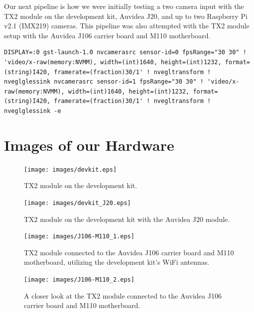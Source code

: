 \documentclass[letterpaper,10pt,serif,draftclsnofoot,onecolumn,compsoc,titlepage]{IEEEtran}
\begin{document}
Our next pipeline is how we were initially testing a two camera input with the TX2 module 
on the development kit, Auvidea J20, and up to two Raspberry Pi v2.1 (IMX219) cameras. 
This pipeline was also attempted with the TX2 module setup with the Auvidea J106 carrier
board and M110 motherboard. \\

\begin{lstlisting}
DISPLAY=:0 gst-launch-1.0 nvcamerasrc sensor-id=0 fpsRange="30 30" ! 'video/x-raw(memory:NVMM), width=(int)1640, height=(int)1232, format=(string)I420, framerate=(fraction)30/1' ! nvegltransform ! nveglglessink nvcamerasrc sensor-id=1 fpsRange="30 30" ! 'video/x-raw(memory:NVMM), width=(int)1640, height=(int)1232, format=(string)I420, framerate=(fraction)30/1' ! nvegltransform ! nveglglessink -e
\end{lstlisting}
\cite{TwoCamPipe}


\section{Images of our Hardware}


\begin{figure}[H]
	\centering
	\label{fig:TX2 module on the development kit.}
	\texttt{[image: images/devkit.eps]}
	\caption{TX2 module on the development kit. \label{overflow}}
\end{figure}


\begin{figure}[H]
	\centering
	\label{fig:TX2 module on the development kit with the Auvidea J20 module.}
	\texttt{[image: images/devkit\_J20.eps]}
	\caption{TX2 module on the development kit with the Auvidea J20 module. \label{overflow}}
\end{figure}


\begin{figure}[H]
	\centering
	\label{fig:TX2 module connected to the Auvidea J106 carrier board and M110 motherboard, utilizing the development kit's WiFi antennas.}
	\texttt{[image: images/J106-M110\_1.eps]}
	\caption{TX2 module connected to the Auvidea J106 carrier board and M110 motherboard, utilizing the development kit's WiFi antennas. \label{overflow}}
\end{figure}


\begin{figure}[H]
	\centering
	\label{fig:A closer look at the TX2 module connected to the Auvidea J106 carrier board and M110 motherboard.}
	\texttt{[image: images/J106-M110\_2.eps]}
	\caption{A closer look at the TX2 module connected to the Auvidea J106 carrier board and M110 motherboard. \label{overflow}}
\end{figure}
\end{document}
